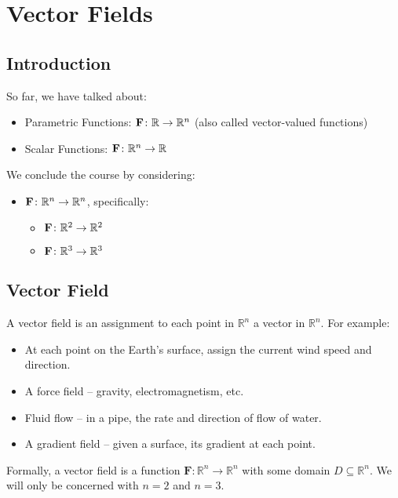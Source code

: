 \section{Vector Fields}

\subsection{Introduction}
So far, we have talked about:

\begin{itemize}
    \item Parametric Functions: \( \mathbf{F} \colon \mathbb{R} \to \mathbb{R}^n \) (also called vector-valued functions)
    \item Scalar Functions: \( \mathbf{F} \colon \mathbb{R}^n \to \mathbb{R} \)
\end{itemize}

We conclude the course by considering:

\begin{itemize}
    \item \( \mathbf{F} \colon \mathbb{R}^n \to \mathbb{R}^n \), specifically:
    \begin{itemize}
        \item \( \mathbf{F} \colon \mathbb{R}^2 \to \mathbb{R}^2 \)
        \item \( \mathbf{F} \colon \mathbb{R}^3 \to \mathbb{R}^3 \)
    \end{itemize}
\end{itemize}

\subsection{Vector Field}
A vector field is an assignment to each point in \( \mathbb{R}^n \) a vector in \( \mathbb{R}^n \). For example:

\begin{itemize}
    \item At each point on the Earth's surface, assign the current wind speed and direction.
    \item A force field – gravity, electromagnetism, etc.
    \item Fluid flow – in a pipe, the rate and direction of flow of water.
    \item A gradient field – given a surface, its gradient at each point.
\end{itemize}

Formally, a vector field is a function \( \mathbf{F} : \mathbb{R}^n \to \mathbb{R}^n \) with some domain \( D \subseteq \mathbb{R}^n \). We will only be concerned with \( n = 2 \) and \( n = 3 \). \\

